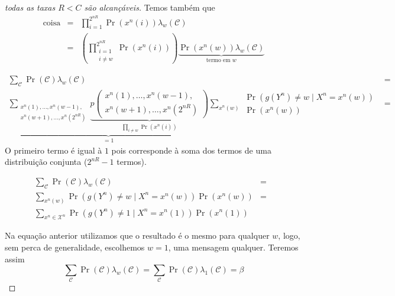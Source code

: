 \begin{frame}[allowframebreaks]
\begin{proof}[todas as taxas $R < C$ são alcançáveis]
  \proofbreak

  Temos também que
  \begin{eqnarray}
  \text{coisa} &=& \prod_{i=1}^{2^{nR}} \Pr(x^n(i)) \lambda_w(\mathcal{C}) \nonumber \\
  	&=& \left( \prod_{ \substack{ i=1 \\ i \neq w} }^{2^{nR}} \Pr(x^n(i)) \right) \underbrace{ \Pr(x^n(w)) \lambda_w(\mathcal{C}) }_{\text{termo em }w}
  \end{eqnarray}
 
  \proofbreak
 
  \vspace{-0.5cm} 
  \begin{eqnarray}
  \sum_{\mathcal{C}} \Pr(\mathcal{C}) \lambda_w(\mathcal{C}) &=& \nonumber \\
  \underbrace{ \sum_{ \substack{ x^n(1), \ldots, x^n(w-1),  \\ x^n(w+1), \ldots, x^n(2^{nR}) } } \underbrace{p\left( \substack{ x^n(1), \ldots, x^n(w-1), \\ x^n(w+1), \ldots, x^n(2^{nR}) } \right)}_{\prod_{i \neq w} \Pr(x^n(i)) } }_{=1}  \sum_{x^n (w)} \substack{ \Pr\left( g(Y^n) \neq w \mid X^n = x^n(w) \right) \\ \Pr\left( x^n(w) \right) } &=& 
  \end{eqnarray}
  O primeiro termo é igual à $1$ pois corresponde à soma dos termos de uma distribuição conjunta ($2^{nR}-1$ termos).

  \proofbreak
  \vspace{-0.5cm}
  \begin{eqnarray}
  \sum_{\mathcal{C}} \Pr(\mathcal{C}) \lambda_w(\mathcal{C}) &=& \nonumber \\
  \sum_{x^n (w)} \Pr\left( g(Y^n) \neq w \mid X^n = x^n(w) \right) \Pr\left( x^n(w) \right) &=& \nonumber \\
  \sum_{x^n \in \mathcal{X}^n} \Pr\left( g(Y^n) \neq 1 \mid X^n = x^n(1) \right) \Pr\left( x^n(1) \right)
  \end{eqnarray}

  \proofbreak
  
  Na equação anterior utilizamos que o resultado é o mesmo para qualquer $w$, logo, sem perca
  de generalidade, escolhemos $w=1$, uma mensagem qualquer. Teremos assim
  \begin{equation}
  \sum_{\mathcal{C}} \Pr(\mathcal{C}) \lambda_w(\mathcal{C}) = \sum_{\mathcal{C}} \Pr(\mathcal{C}) \lambda_1(\mathcal{C}) = \beta
  \end{equation}


\end{proof}
\end{frame}
